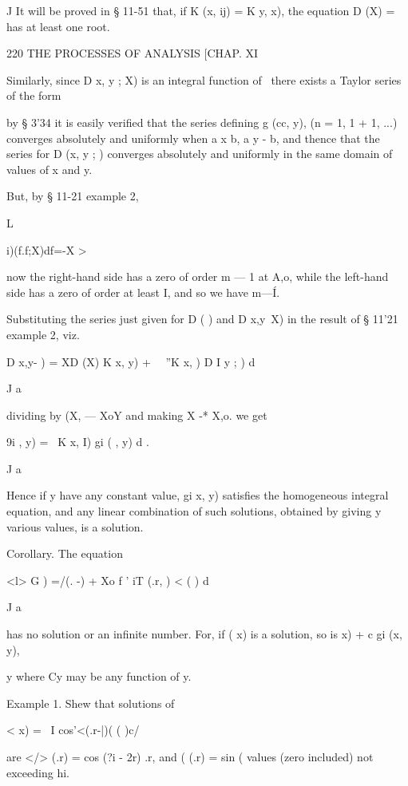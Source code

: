 J It will be proved in § 11-51 that, if K (x, ij) = K y, x), the equation D (X) = has at least one 
root. 



220 THE PROCESSES OF ANALYSIS [CHAP. XI 

Similarly, since D  x, y ; X) is an integral function of \, there exists 
a Taylor series of the form 

by § 3'34 it is easily verified that the series defining g  (cc, y), (n = 1, 1 + 1, ...) 
converges absolutely and uniformly when a x b, a y - b, and thence that 
the series for D (x, y ;  )  converges absolutely and uniformly in the same 
domain of values of x and y. 

But, by § 11-21 example 2, 



L 



i)(f.f;X)df=-X > 



now the right-hand side has a zero of order m — 1 at A,o, while the left-hand 
side has a zero of order at least I, and so we have m—\'  I. 

Substituting the series just given for D ( )  and D  x,y\ X) in the result of 
§ 11'21 example 2, viz. 

D x,y- )  = XD (X) K  x, y) + \ \ ''K  x,  ) D  I y ;  )  d  

J a 

dividing by (X, — XoY and making X -* X,o. we get 

9i   , y) = \ K  x, I) gi ( , y) d . 

J a 

Hence if y have any constant value, gi x, y) satisfies the homogeneous 
integral equation, and any linear combination of such solutions, obtained by 
giving y various values, is a solution. 

Corollary. The equation 

<l> G ) =/(. -) + Xo f ' iT (.r,  ) <  ( ) d  

J a 

has no solution or an infinite number. For, if (   x) is a solution, so is  x) +  c gi (x, y), 

y 
where Cy may be any function of y. 

Example 1. Shew that solutions of 

<  x) = \ I cos'<(.r-|)( ( )c/  

are </> (.r) = cos (?i - 2r) .r, and (  (.r) = sin (%
values (zero included) not exceeding hi. 

